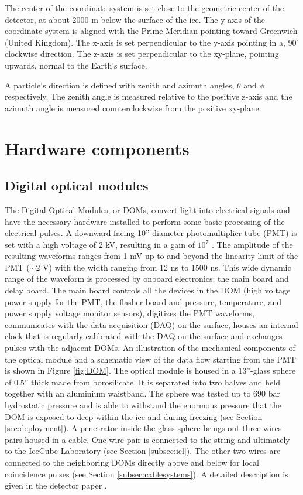 \noindent The center of the coordinate system is set close to the geometric center of the detector, at about 2000 m below the surface of the ice. The y-axis of the coordinate system is aligned with the Prime Meridian pointing toward Greenwich (United Kingdom). The x-axis is set perpendicular to the y-axis pointing in a, 90$^\circ$ clockwise direction. The z-axis is set perpendicular to the xy-plane, pointing upwards, normal to the Earth's surface.

A particle's direction is defined with zenith and azimuth angles, $\theta$ and $\phi$ respectively. The zenith angle is measured relative to the positive z-axis and the azimuth angle is measured counterclockwise from the positive xy-plane.



\section{Hardware components}
\subsection{Digital optical modules}
\label{subsec:doms}
The Digital Optical Modules, or DOMs, convert light into electrical signals and have the necessary hardware installed to perform some basic processing of the electrical pulses. A downward facing 10''-diameter photomultiplier tube (PMT) is set with a high voltage of 2 kV, resulting in a gain of $10^7$ \cite{Aartsen:2016nxy}. The amplitude of the resulting waveforms ranges from 1 mV up to and beyond the linearity limit of the PMT ($\sim2$ V) with the width ranging from 12 ns to 1500 ns. This wide dynamic range of the waveform is processed by onboard electronics: the main board and delay board. The main board controls all the devices in the DOM (high voltage power supply for the PMT, the flasher board and pressure, temperature, and power supply voltage monitor sensors), digitizes the PMT waveforms, communicates with the data acquisition (DAQ) on the surface, houses an internal clock that is regularly calibrated with the DAQ on the surface and exchanges pulses with the adjacent DOMs.
An illustration of the mechanical components of the optical module and a schematic view of the data flow starting from the PMT is shown in Figure \ref{fig:DOM}. The optical module is housed in a 13''-glass sphere of 0.5'' thick made from borosilicate. It is separated into two halves and held together with an aluminium waistband. The sphere was tested up to 690 bar hydrostatic pressure and is able to withstand the enormous pressure that the DOM is exposed to deep within the ice and during freezing (see Section \ref{sec:deployment}). A penetrator inside the glass sphere brings out three wires pairs housed in a cable. One wire pair is connected to the string and ultimately to the IceCube Laboratory (see Section \ref{subsec:icl}). The other two wires are connected to the neighboring DOMs directly above and below for local coincidence pulses (see Section \ref{subsec:cablesystems}). A detailed description is given in the detector paper \cite{Aartsen:2016nxy}.

